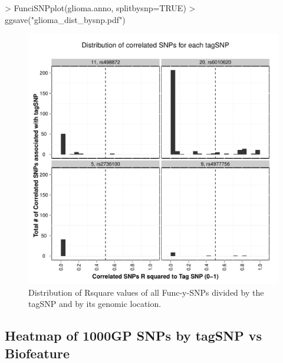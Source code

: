 \documentclass[12pt,fullpage]{article}
\begin{document}
\begin{Schunk}
\begin{Sinput}
> FunciSNPplot(glioma.anno, splitbysnp=TRUE)
> ggsave("glioma_dist_bysnp.pdf")
\end{Sinput}
\end{Schunk}

\begin{figure}[ht!]                                                              
\begin{center}                                                                   
\includegraphics{glioma_dist_bysnp.pdf}                                          
\caption{\label{fig:glioma_dist_bysnp.pdf} Distribution of Rsquare values of all 
     Func-y-SNPs divided by the tagSNP and by its genomic location.}                 
{\footnotesize{}}                                                                
\end{center}                                                                     
\end{figure}

\subsection{Heatmap of 1000GP SNPs by tagSNP vs Biofeature}
\end{document}
